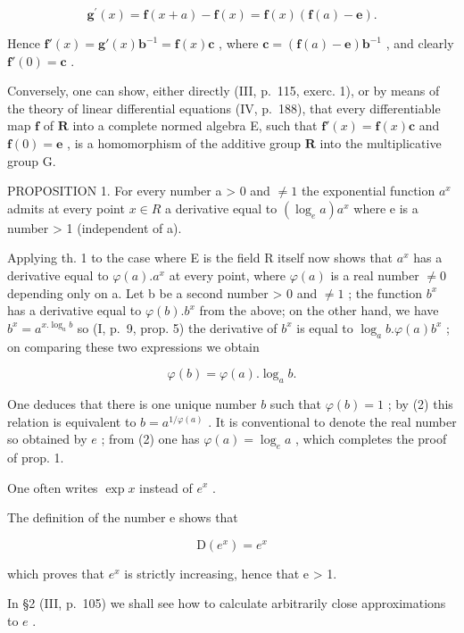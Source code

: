 \[
\mathbf {g} ^ {\prime} (x) = \mathbf {f} (x + a) - \mathbf {f} (x) = \mathbf {f} (x) (\mathbf {f} (a) - \mathbf {e}).
\]

Hence \(\mathbf{f}'(x) = \mathbf{g}'(x)\mathbf{b}^{-1} = \mathbf{f}(x)\mathbf{c}\) , where \(\mathbf{c} = (\mathbf{f}(a) - \mathbf{e})\mathbf{b}^{-1}\) , and clearly \(\mathbf{f}'(0) = \mathbf{c}\) .

Conversely, one can show, either directly (III, p.~115, exerc. 1), or by means of the theory of linear differential equations (IV, p.~188), that every differentiable map \(\mathbf{f}\) of \(\mathbf{R}\) into a complete normed algebra E, such that \(\mathbf{f}'(x) = \mathbf{f}(x)\mathbf{c}\) and \(\mathbf{f}(0) = \mathbf{e}\) , is a homomorphism of the additive group \(\mathbf{R}\) into the multiplicative group G.

PROPOSITION 1. For every number a \textgreater{} 0 and \(\neq 1\) the exponential function \(a^{x}\) admits at every point \(x \in R\) a derivative equal to \((\log_{e}a)a^{x}\) where e is a number \textgreater{} 1 (independent of a).

Applying th. 1 to the case where E is the field R itself now shows that \(a^{x}\) has a derivative equal to \(\varphi(a).a^{x}\) at every point, where \(\varphi(a)\) is a real number \(\neq 0\) depending only on a. Let b be a second number \textgreater{} 0 and \(\neq 1\) ; the function \(b^{x}\) has a derivative equal to \(\varphi(b).b^{x}\) from the above; on the other hand, we have \(b^{x} = a^{x.\log_{a}b}\) so (I, p.~9, prop. 5) the derivative of \(b^{x}\) is equal to \(\log_{a}b.\varphi(a)b^{x}\) ; on comparing these two expressions we obtain

\[
\varphi (b) = \varphi (a). \log_ {a} b.\tag{2}
\]

One deduces that there is one unique number \(b\) such that \(\varphi(b) = 1\) ; by (2) this relation is equivalent to \(b = a^{1/\varphi(a)}\) . It is conventional to denote the real number so obtained by \(e\) ; from (2) one has \(\varphi(a) = \log_e a\) , which completes the proof of prop. 1.

One often writes \(\exp x\) instead of \(e^x\) .

The definition of the number e shows that

\[
\mathrm{D} (e ^ {x}) = e ^ {x}\tag{3}
\]

which proves that \(e^{x}\) is strictly increasing, hence that e \textgreater{} 1.

In §2 (III, p.~105) we shall see how to calculate arbitrarily close approximations to \(e\) .

